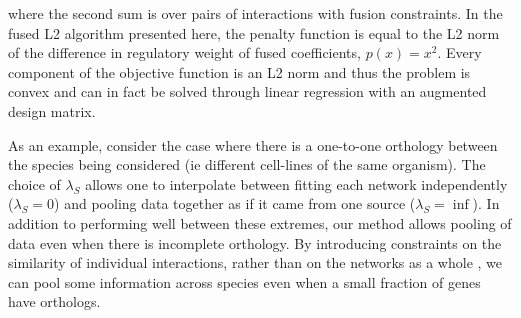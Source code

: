 \documentclass[11pt]{article}
\begin{document}
where the second sum is over pairs of interactions with fusion constraints. 
In the fused L2 algorithm presented here, the penalty function is equal to the L2 norm of the difference in regulatory weight of fused coefficients, $p(x)=x^2$. 
Every component of the objective function is an L2 norm and thus the problem is convex and can in fact be solved through linear regression with an augmented design matrix. 

As an example, consider the case where there is a one-to-one orthology between the species being considered (ie different cell-lines of the same organism). 
The choice of $\lambda_S$ allows one to interpolate between fitting each network independently ($\lambda_S=0$) and pooling data together as if it came from one source ($\lambda_S=\inf$). 
In addition to performing well between these extremes, our method allows pooling of data even when there is incomplete orthology. 
By introducing constraints on the similarity of individual interactions, rather than on the networks as a whole \cite{liu2011temporal}, we can pool some information across species even when a small fraction of genes have orthologs. 
\end{document}
